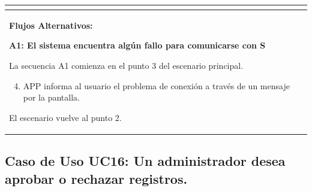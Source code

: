 \begin{longtable}{|l|p{5.5cm}|l|p{2cm}|l|p{1.9cm}|}
{    } \\ \hline

    \multicolumn{6}{|p{15cm}|}{ \textbf{Flujos Alternativos: }
    
    \textbf{A1: El sistema encuentra algún fallo para comunicarse con S}
    
    La secuencia A1 comienza en el punto 3 del escenario principal.
    \begin{enumerate}
        \setcounter{enumi}{3}
        \item APP informa al usuario el problema de conexión a través de un mensaje por la pantalla.
    \end{enumerate}

    El escenario vuelve al punto 2.

    } \\ \hline

\end{longtable}


\subsection{Caso de Uso UC16: Un administrador desea aprobar o rechazar registros.}

